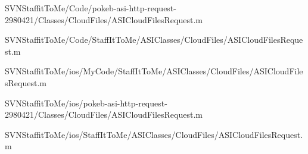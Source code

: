 \begin{DoxyCompactItemize}
\-S\-V\-N\-Staffit\-To\-Me/\-Code/pokeb-\/asi-\/http-\/request-\/2980421/\-Classes/\-Cloud\-Files/\-A\-S\-I\-Cloud\-Files\-Request.\-m\item 
\-S\-V\-N\-Staffit\-To\-Me/\-Code/\-Staff\-It\-To\-Me/\-A\-S\-I\-Classes/\-Cloud\-Files/\-A\-S\-I\-Cloud\-Files\-Request.\-m\item 
\-S\-V\-N\-Staffit\-To\-Me/ios/\-My\-Code/\-Staff\-It\-To\-Me/\-A\-S\-I\-Classes/\-Cloud\-Files/\-A\-S\-I\-Cloud\-Files\-Request.\-m\item 
\-S\-V\-N\-Staffit\-To\-Me/ios/pokeb-\/asi-\/http-\/request-\/2980421/\-Classes/\-Cloud\-Files/\-A\-S\-I\-Cloud\-Files\-Request.\-m\item 
\-S\-V\-N\-Staffit\-To\-Me/ios/\-Staff\-It\-To\-Me/\-A\-S\-I\-Classes/\-Cloud\-Files/\-A\-S\-I\-Cloud\-Files\-Request.\-m\end{DoxyCompactItemize}
